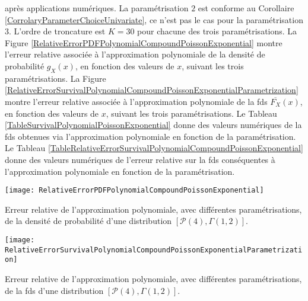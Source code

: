après applications numériques. La paramétrisation $2$ est conforme au Corollaire \ref{CorrolaryParameterChoiceUnivariate}, ce n'est pas le cas pour la paramétrisation $3$.  L\rq{}ordre de troncature est $K=30$ pour chacune des trois paramétrisations. La Figure \ref{RelativeErrorPDFPolynomialCompoundPoissonExponential} montre l\rq{}erreur relative associée à l'approximation polynomiale de la densité de probabilité $g_{X}(x)$, en fonction des valeurs de $x$, suivant les trois paramétrisations. La Figure \ref{RelativeErrorSurvivalPolynomialCompoundPoissonExponentialParametrization} montre l\rq{}erreur relative associée à l'approximation polynomiale de la \gls{fds} $\overline{F_{X}}(x)$, en fonction des valeurs de $x$, suivant les trois paramétrisations. Le Tableau \ref{TableSurvivalPolynomialPoissonExponential} donne des valeurs numériques de la \gls{fds} obtenues via l'approximation polynomiale en fonction de la paramétrisation. Le Tableau \ref{TableRelativeErrorSurvivalPolynomialCompoundPoissonExponential} donne des valeurs numériques de l'erreur relative sur la \gls{fds} conséquentes à l'approximation polynomiale en fonction de la paramétrisation.\\
\begin{figureth}			
\texttt{[image: RelativeErrorPDFPolynomialCompoundPoissonExponential]}
\caption{Erreur relative de l'approximation polynomiale, avec différentes paramétrisations, de la densité de probabilité d'une distribution $\left[\mathcal{P}(4),\Gamma(1,2)\right]$.}		
\label{RelativeErrorPDFPolynomialCompoundPoissonExponential}
\end{figureth}
\begin{figureth}			
\texttt{[image: RelativeErrorSurvivalPolynomialCompoundPoissonExponentialParametrization]}
\caption{Erreur relative de l'approximation polynomiale, avec différentes paramétrisations, de la \gls{fds} d'une distribution $\left[\mathcal{P}(4),\Gamma(1,2)\right]$.}		
\label{RelativeErrorSurvivalPolynomialCompoundPoissonExponentialParametrization}
	\end{figureth}

